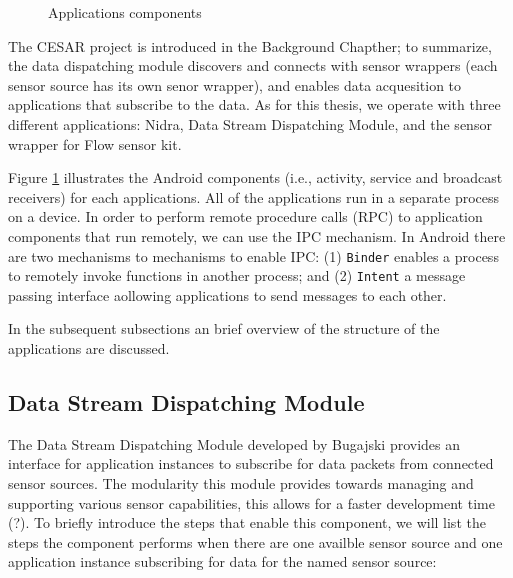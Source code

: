 \begin{figure}
    \caption{Applications components}
    \label{fig:app_components}
\end{figure}

The CESAR project is introduced in the Background Chapther; to summarize, the data dispatching module discovers and connects with sensor wrappers (each sensor source has its own senor wrapper), and enables data acquesition to applications that subscribe to the data. As for this thesis, we operate with three different applications: Nidra, Data Stream Dispatching Module, and the sensor wrapper for Flow sensor kit. 

Figure \ref{fig:app_components} illustrates the Android components (i.e., activity, service and broadcast receivers) for each applications. All of the applications run in a separate process on a device. In order to perform remote procedure calls (RPC) to application components that run remotely, we can use the IPC mechanism. In Android there are two mechanisms to mechanisms to enable IPC: (1) \verb|Binder| enables a process to remotely invoke functions in another process; and (2) \verb|Intent| a message passing interface aollowing applications to send messages to each other.

In the subsequent subsections an brief overview of the structure of the applications are discussed. 

\subsection{Data Stream Dispatching Module}
The Data Stream Dispatching Module developed by Bugajski provides an interface for application instances to subscribe for data packets from connected sensor sources. The modularity this module provides towards managing and supporting various sensor capabilities, this allows for a faster development time (?). To briefly introduce the steps that enable this component, we will list the steps the component performs when there are one availble sensor source and one application instance subscribing for data for the named sensor source:

